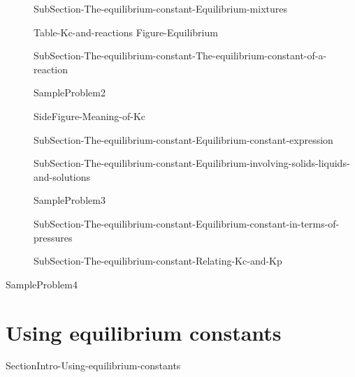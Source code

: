 \documentclass[main.tex]{subfiles}
\begin{document}
\sloppy\begin{description}



\item[] {SubSection-The-equilibrium-constant-Equilibrium-mixtures}



 {Table-Kc-and-reactions}\newpage
{Figure-Equilibrium}

\item[] {SubSection-The-equilibrium-constant-The-equilibrium-constant-of-a-reaction}



  {SampleProblem2}

{SideFigure-Meaning-of-Kc}






\item[] {SubSection-The-equilibrium-constant-Equilibrium-constant-expression}

 
\item[] {SubSection-The-equilibrium-constant-Equilibrium-involving-solids-liquids-and-solutions}


  {SampleProblem3}


\item[] {SubSection-The-equilibrium-constant-Equilibrium-constant-in-terms-of-pressures}



\item[] {SubSection-The-equilibrium-constant-Relating-Kc-and-Kp}



\end{description}
  {SampleProblem4}











\section{ {Using equilibrium constants}}   {SectionIntro-Using-equilibrium-constants}
\end{document}
